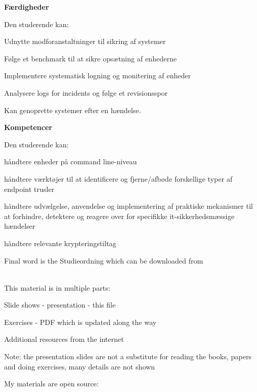\documentclass[Screen16to9,17pt]{foils}
\begin{document}

{\bf Færdigheder}

Den studerende kan:
\begin{list2}
\item Udnytte modforanstaltninger til sikring af systemer
\item Følge et benchmark til at sikre opsætning af enhederne
\item Implementere systematisk logning og monitering af enheder
\item Analysere logs for incidents og følge et revisionsspor
\item Kan genoprette systemer efter en hændelse.
\end{list2}


{\bf Kompetencer}

Den studerende kan:
\begin{list2}
\item håndtere enheder på command line-niveau
\item håndtere værktøjer til at identificere og fjerne/afbøde forskellige typer af endpoint trusler
\item håndtere udvælgelse, anvendelse og implementering af praktiske mekanismer til at forhindre, detektere og reagere over for specifikke it-sikkerhedsmæssige hændelser
\item håndtere relevante krypteringstiltag
\end{list2}

Final word is the Studieordning which can be downloaded from\\
{\footnotesize {}\\
}




\begin{list1}
\item This material is in multiple parts:
\begin{list2}
\item Slide shows - presentation - this file
\item Exercises - PDF which is updated along the way
\end{list2}
\item Additional resources from the internet
\item Note: the presentation slides are not a substitute for reading the books, papers and doing exercises, many details are not shown
\item My materials are open source:
\begin{list2}
\item {}
\item {}
\end{list2}
\end{list1}
\end{document}

